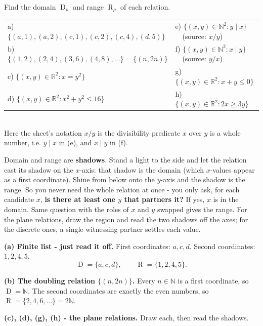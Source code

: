 \documentclass[11pt,a4paper]{article}
\newcommand{\R}{\mathbb{R}}
\newcommand{\N}{\mathbb{N}}
\DeclareMathOperator{\Dom}{D}
\DeclareMathOperator{\Ran}{R}
\begin{document}
\begin{problembox}[1.2]
Find the domain $\Dom_\rho$ and range $\Ran_\rho$ of each relation.
\\[2pt]
\begin{tabular}{@{}ll@{}}
a) $\{(a,1),(a,2),(c,1),(c,2),(c,4),(d,5)\}$ &
e) $\{(x,y)\in\N^2 : y\mid x\}$\ \ (source: $x/y$)\\
b) $\{(1,2),(2,4),(3,6),(4,8),\dots\}=\{(n,2n)\}$ &
f) $\{(x,y)\in\N^2 : x\mid y\}$\ \ (source: $y/x$)\\
c) $\{(x,y)\in\R^2 : x=y^2\}$ &
g) $\{(x,y)\in\R^2 : x+y\le 0\}$\\
d) $\{(x,y)\in\R^2 : x^2+y^2\le 16\}$ &
h) $\{(x,y)\in\R^2 : 2x\ge 3y\}$
\end{tabular}
\\[3pt]
\footnotesize Here the sheet's notation $x/y$ is the divisibility predicate
\textquotedbl{}$x$ over $y$ is a whole number\textquotedbl{}, i.e. $y\mid x$ in (e), and $x\mid y$ in (f).
\end{problembox}

\begin{ideabox}
Domain and range are \textbf{shadows}. Stand a light to the side and let the relation cast its
shadow on the $x$-axis: that shadow is the domain (which $x$-values appear as a first coordinate).
Shine from below onto the $y$-axis and the shadow is the range. So you never need the whole relation
at once - you only ask, for each candidate $x$, \textbf{\textquotedbl{}is there at least one $y$
that partners it?\textquotedbl{}} If yes, $x$ is in the domain. Same question with the roles of
$x$ and $y$ swapped gives the range. For the plane relations, draw the region and read the two
shadows off the axes; for the discrete ones, a single witnessing partner settles each value.
\end{ideabox}

\textbf{(a) Finite list - just read it off.}
First coordinates: $a,c,d$. Second coordinates: $1,2,4,5$.
\[\Dom=\{a,c,d\},\qquad \Ran=\{1,2,4,5\}.\]

\textbf{(b) The doubling relation $\{(n,2n)\}$.}
Every $n\in\N$ is a first coordinate, so $\Dom=\N$. The second coordinates are exactly the even
numbers, so $\Ran=\{2,4,6,\dots\}=2\N$.

\textbf{(c), (d), (g), (h) - the plane relations.} Draw each, then read the shadows.
\end{document}
